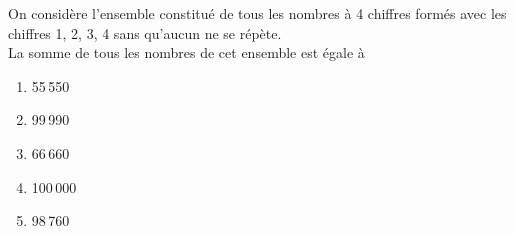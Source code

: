 On considère l'ensemble constitué de tous les nombres à 4 chiffres formés avec les chiffres 1, 2, 3, 4 sans qu'aucun ne se répète.
\\La somme de tous les nombres de cet ensemble est égale à
\begin{multicols}{5}
  \begin{enumerate}[A/]
  \item 55\,550
  \item 99\,990
  \item 66\,660
  \item 100\,000
  \item 98\,760
  \end{enumerate}
\end{multicols}